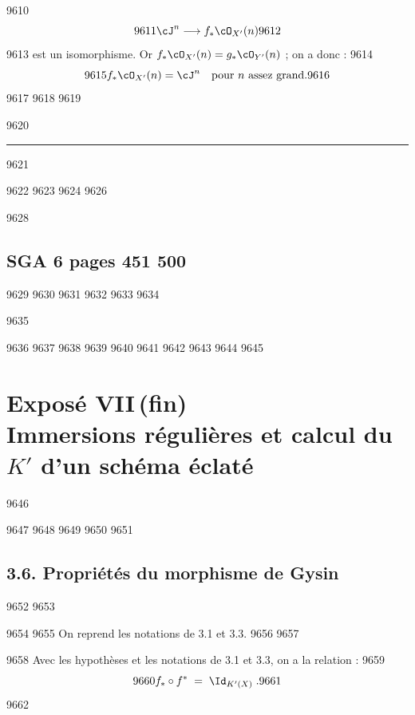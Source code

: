   9610	\[
  9611	\cJ^n \longrightarrow f_{*}\cO_{X'}(n)
  9612	\]
  9613	est un isomorphisme. Or $f_{*}\cO_{X'}(n) = g_{*}\cO_{Y'}(n)$ ; on a donc :
  9614	\[
  9615	f_{*}\cO_{X'}(n) = \cJ^n \quad \text{pour } n \text{ assez grand}.
  9616	\]
  9617	
  9618	\vfill
  9619	\begin{center}
  9620	\rule{0.5\textwidth}{0.4pt}
  9621	\end{center}
  9622	
  9623	
  9624		%
  9626		
  9628	\section*{SGA 6 pages 451 500}
  9629	\setcounter{page}{451}
  9630	
  9631	%
  9632	%
  9633	%
  9634	\begin{titlepage}
  9635	\end{titlepage}
  9636	
  9637	
  9638	
  9639	
  9640	%
  9641	%
  9642	%
  9643	%
  9644	
  9645	\chapter*{Exposé VII\,(fin)\\Immersions régulières et calcul du $K'$ d'un schéma éclaté}
  9646	
  9647	
  9648	\setcounter{section}{3}
  9649	\setcounter{proposition}{5}
  9650	
  9651	\section*{3.6. Propriétés du morphisme de Gysin}
  9652	
  9653	
  9654	
  9655	On reprend les notations de 3.1 et 3.3.
  9656	
  9657	\begin{proposition}[3.6]%
  9658	Avec les hypothèses et les notations de 3.1 et 3.3, on a la relation :
  9659	\[
  9660	f_* \circ f^* \; = \; \Id_{K'(X)}\; .
  9661	\]
  9662	\end{proposition}
